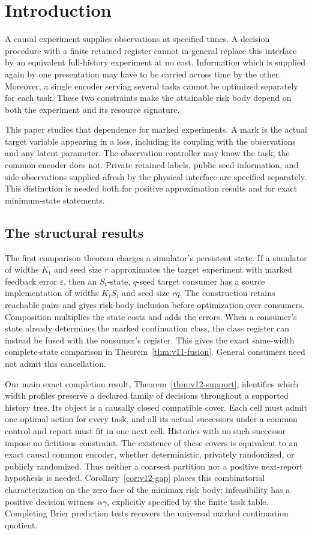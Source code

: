 \section{Introduction}
\label{sec:v12-introduction}

A causal experiment supplies observations at specified times. A decision
procedure with a finite retained register cannot in general replace this
interface by an equivalent full-history experiment at no cost. Information
which is supplied again by one presentation may have to be carried across
time by the other. Moreover, a single encoder serving several tasks cannot
be optimized separately for each task. These two constraints make the
attainable risk body depend on both the experiment and its resource
signature.

This paper studies that dependence for marked experiments. A mark is the
actual target variable appearing in a loss, including its coupling with
the observations and any latent parameter. The observation controller
may know the task; the common encoder does not. Private retained labels,
public seed information, and side observations supplied afresh by the
physical interface are specified separately. This distinction is needed
both for positive approximation results and for exact minimum-state
statements.

\subsection{The structural results}
The first comparison theorem charges a simulator's persistent state.
If a simulator of widths $K_t$ and seed size $r$ approximates the target
experiment with marked feedback error $\varepsilon$, then an $S_t$-state,
$q$-seed target consumer has a source implementation of widths $K_tS_t$
and seed size $rq$. The construction retains reachable pairs and gives
risk-body inclusion before optimization over consumers. Composition
multiplies the state costs and adds the errors. When a consumer's state
already determines the marked continuation class, the class register can
instead be fused with the consumer's register. This gives the exact
same-width complete-state comparison in
Theorem~\ref{thm:v11-fusion}. General consumers need not admit this
cancellation.

Our main exact completion result, Theorem~\ref{thm:v12-support}, identifies
which width profiles preserve a declared family of decisions throughout
a supported history tree. Its object is a causally closed compatible
cover. Each cell must admit one optimal action for every task, and all
its actual successors under a common control and report must fit in one
next cell. Histories with no such successor impose no fictitious
constraint. The existence of these covers is equivalent to an exact
causal common encoder, whether deterministic, privately randomized, or
publicly randomized. Thus neither a coarsest partition nor a positive
next-report hypothesis is needed. Corollary~\ref{cor:v12-gap} places this
combinatorial characterization on the zero face of the minimax risk body:
infeasibility has a positive decision witness $\alpha\gamma$, explicitly
specified by the finite task table. Completing Brier prediction tests
recovers the universal marked continuation quotient.

